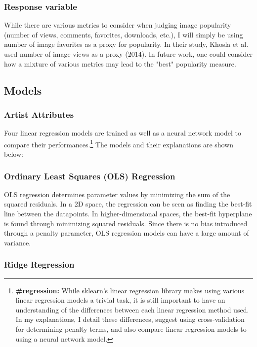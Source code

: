 \documentclass[11pt]{article}
\begin{document}
\subsubsection{Response variable}

While there are various metrics to consider when judging image
popularity (number of views, comments, favorites, downloads, etc.), I
will simply be using number of image favorites as a proxy for
popularity. In their study, Khosla et al. used number of image views as a proxy (2014). In future work, one could consider how a mixture of various metrics may lead to the "best" popularity measure.

\subsection{Models}

\subsubsection{Artist Attributes}

Four linear regression models are trained as well as a neural network
model to compare their performances.\footnote{\textbf{\#regression:} While sklearn's linear regression library makes using various linear regression models a trivial task, it is still important to have an understanding of the differences between each linear regression method used. In my explanations, I detail these differences, suggest using cross-validation for determining penalty terms, and also compare linear regression models to using a neural network model.} The models and their explanations are shown below:

\subsubsection*{Ordinary Least Squares (OLS) Regression}

OLS regression determines parameter values by minimizing the sum of the
squared residuals. In a 2D space, the regression can be seen as finding
the best-fit line between the datapoints. In higher-dimensional spaces,
the best-fit hyperplane is found through minimizing squared residuals.
Since there is no bias introduced through a penalty parameter, OLS
regression models can have a large amount of variance.

\subsubsection*{Ridge Regression}
\end{document}
